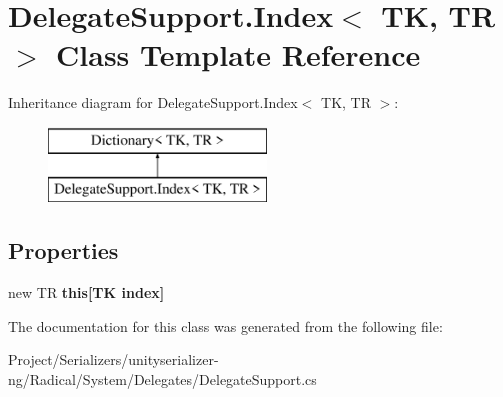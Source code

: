 \hypertarget{class_delegate_support_1_1_index}{}\section{Delegate\+Support.\+Index$<$ TK, TR $>$ Class Template Reference}
\label{class_delegate_support_1_1_index}
Inheritance diagram for Delegate\+Support.\+Index$<$ TK, TR $>$\+:\begin{figure}[H]
\begin{center}
\leavevmode
\includegraphics[height=2.000000cm]{class_delegate_support_1_1_index}
\end{center}
\end{figure}
\subsection*{Properties}
\begin{DoxyCompactItemize}
\item 
\mbox{\label{class_delegate_support_1_1_index_a0d0e0be0a9e6aa092055fe2282c6e64b}} 
new TR {\bfseries this\mbox{[}\+T\+K index\mbox{]}}
\end{DoxyCompactItemize}


The documentation for this class was generated from the following file\+:\begin{DoxyCompactItemize}
\item 
Project/\+Serializers/unityserializer-\/ng/\+Radical/\+System/\+Delegates/Delegate\+Support.\+cs\end{DoxyCompactItemize}
